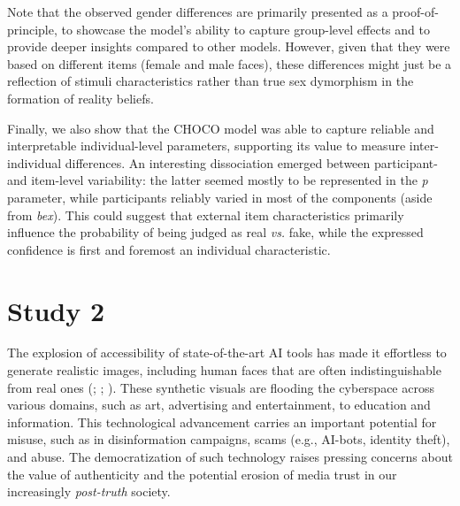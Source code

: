 \documentclass[
  jou,
  floatsintext,
  longtable,
  nolmodern,
  notxfonts,
  notimes,
  colorlinks=true,linkcolor=blue,citecolor=blue,urlcolor=blue]{apa7}
\begin{document}
Note that the observed gender differences are primarily presented as a
proof-of-principle, to showcase the model's ability to capture
group-level effects and to provide deeper insights compared to other
models. However, given that they were based on different items (female
and male faces), these differences might just be a reflection of stimuli
characteristics rather than true sex dymorphism in the formation of
reality beliefs.

Finally, we also show that the CHOCO model was able to capture reliable
and interpretable individual-level parameters, supporting its value to
measure inter-individual differences. An interesting dissociation
emerged between participant- and item-level variability: the latter
seemed mostly to be represented in the \emph{p} parameter, while
participants reliably varied in most of the components (aside from
\emph{bex}). This could suggest that external item characteristics
primarily influence the probability of being judged as real \emph{vs.}
fake, while the expressed confidence is first and foremost an individual
characteristic.

\section{Study 2}\label{study-2}

The explosion of accessibility of state-of-the-art AI tools has made it
effortless to generate realistic images, including human faces that are
often indistinguishable from real ones
(;
;
). These
synthetic visuals are flooding the cyberspace across various domains,
such as art, advertising and entertainment, to education and
information. This technological advancement carries an important
potential for misuse, such as in disinformation campaigns, scams (e.g.,
AI-bots, identity theft), and abuse. The democratization of such
technology raises pressing concerns about the value of authenticity and
the potential erosion of media trust in our increasingly
\emph{post-truth} society.
\end{document}
